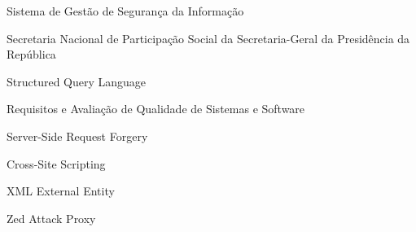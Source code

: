 \begin{siglas}
  \item[SGSI] Sistema de Gestão de Segurança da Informação
  \item[SNPS/SGPR] Secretaria Nacional de Participação Social da Secretaria-Geral da Presidência da República
  \item[SQL] Structured Query Language
  \item[SQuaRE] Requisitos e Avaliação de Qualidade de Sistemas e Software
  \item[SSRF] Server-Side Request Forgery
  \item[XSS] Cross-Site Scripting
  \item[XXE] XML External Entity
  \item[ZAP] Zed Attack Proxy
\end{siglas}
